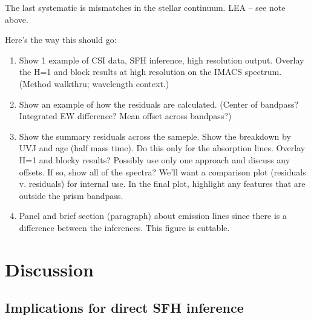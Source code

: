 \documentclass[a4paper,fleqn,usenatbib]{mnras}
\newcommand{\bfb}{\color{myblue}}
\newcommand{\benum}{\begin{enumerate}}
\newcommand{\eenum}{\end{enumerate}}
\begin{document}
The last systematic is mismatches in the stellar continuum. {\bfb LEA -- see note above.}

Here's the way this should go:
\benum
	\item Show 1 example of CSI data, SFH inference, high resolution output. Overlay the H=1 and block
		results at high resolution on the IMACS spectrum. (Method walkthru; wavelength context.)
	\item Show an example of how the residuals are calculated. (Center of bandpass? Integrated EW
		difference? Mean offset across bandpass?)
	\item Show the summary residuals across the sameple. Show the breakdown by UVJ and age 
		(half mass time). 	Do this only for the absorption lines. Overlay H=1 and blocky results? Possibly use
		only one approach and discuss any offsets. If so, show all of the spectra? We'll want a comparison 
		plot (residuals v. residuals) for internal use. In the final plot, highlight any features that are 
		outside the 	prism bandpass.
	\item Panel and brief section (paragraph) about emission lines since there is a difference between
		the inferences. This figure is cuttable.
\eenum
\fi


\section{Discussion}
\label{sec:discussion}



\subsection{Implications for direct SFH inference}
\label{sec:sedMap}
\end{document}
